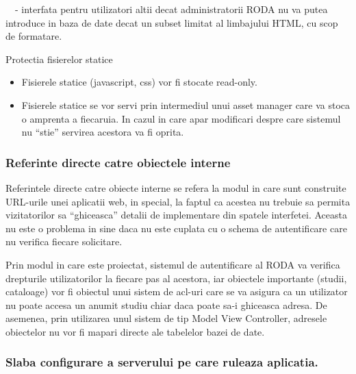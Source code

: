 {\sffamily\color{black}
\ \ {}- interfata pentru utilizatori altii decat administratorii RODA nu va putea introduce in baza de date decat un
subset limitat al limbajului HTML, cu scop de formatare. }


\bigskip

{\sffamily\color{black}
Protectia fisierelor statice}
\begin{itemize}
  \item 
  Fisierele statice (javascript, css) vor fi stocate read-only.
  \item 
  Fisierele statice se vor servi prin intermediul unui asset manager care va stoca o amprenta a fiecaruia. In cazul in
care apar modificari despre care sistemul nu ``stie'' servirea acestora va fi oprita.
\end{itemize}

\bigskip

\subsubsection{Referinte directe catre obiectele interne}

\bigskip

{\sffamily\color{black}
Referintele directe catre obiecte interne se refera la modul in care sunt construite URL-urile unei aplicatii web, in
special, la faptul ca acestea nu trebuie sa permita vizitatorilor sa ``ghiceasca'' detalii de implementare din spatele
interfetei. Aceasta nu este o problema in sine daca nu este cuplata cu o schema de autentificare care nu verifica
fiecare solicitare. }


\bigskip

{\sffamily\color{black}
Prin modul in care este proiectat, sistemul de autentificare al RODA va verifica drepturile utilizatorilor la fiecare
pas al acestora, iar obiectele importante (studii, cataloage) vor fi obiectul unui sistem de acl-uri care se va asigura
ca un utilizator nu poate accesa un anumit studiu chiar daca poate sa-i ghiceasca adresa. De asemenea, prin utilizarea
unul sistem de tip Model View Controller, adresele obiectelor nu vor fi mapari directe ale tabelelor bazei de date. }


\bigskip

\subsubsection{Slaba configurare a serverului pe care ruleaza aplicatia. }


\bigskip

